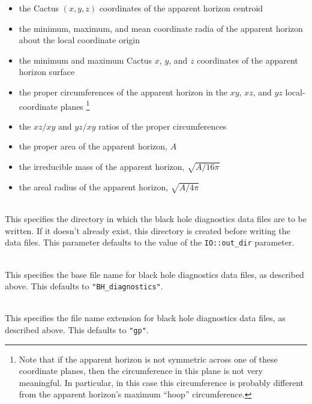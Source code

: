 \begin{description}
\begin{itemize}
\begin{itemize}
		\item	the Cactus $(x,y,z)$ coordinates of the apparent
			horizon centroid
		\item	the minimum, maximum, and mean coordinate radia
			of the apparent horizon about the local
			coordinate origin
		\item	the minimum and maximum Cactus $x$, $y$, and $z$
			coordinates of the apparent horizon surface
		\item	the proper circumferences of the apparent horizon
			in the $xy$, $xz$, and $yz$ local-coordinate planes%
\footnote{%
	 Note that if the apparent horizon is not
	 symmetric across one of these coordinate planes,
	 then the circumference in this plane is not
	 very meaningful.  In particular, in this case
	 this circumference is probably different from
	 the apparent horizon's maximum ``hoop'' circumference.
	 }%
		\item	the $xz/xy$ and $yz/xy$ ratios of the proper
			circumferences
		\item	the proper area of the apparent horizon, $A$
		\item	the irreducible mass of the apparent horizon,
			$\sqrt{A/16\pi}$
		\item	the areal radius of the apparent horizon,
			$\sqrt{A/4\pi}$
		\end{itemize}
	\end{itemize}

\item[\code{BH\_diagnostics\_directory}]
\mbox{}\\
	This specifies the directory in which the black hole diagnostics
	data files are to be written.  If it doesn't already exist, this
	directory is created before writing the data files.  This parameter
	defaults to the value of the \verb|IO::out_dir| parameter.

\item[\code{BH\_diagnostics\_base\_file\_name}]
\mbox{}\\
	This specifies the base file name for black hole diagnostics
	data files, as described above.  This defaults to
	\verb|"BH_diagnostics"|.

\item[\code{BH\_diagnostics\_file\_name\_extension}]
\mbox{}\\
	This specifies the file name extension for black hole diagnostics
	data files, as described above.  This defaults to \verb|"gp"|.
\end{description}


